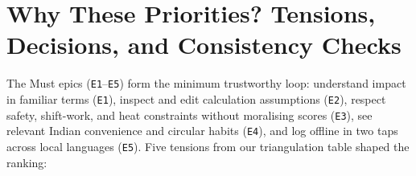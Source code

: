 \documentclass[12pt, a4paper]{article}
\begin{document}
\section{Why These Priorities? Tensions, Decisions, and Consistency Checks}

The Must epics (\texttt{E1}--\texttt{E5}) form the minimum trustworthy loop: understand impact in familiar terms (\texttt{E1}), inspect and edit calculation assumptions (\texttt{E2}), respect safety, shift-work, and heat constraints without moralising scores (\texttt{E3}), see relevant Indian convenience and circular habits (\texttt{E4}), and log offline in two taps across local languages (\texttt{E5}). Five tensions from our triangulation table shaped the ranking:
\end{document}
